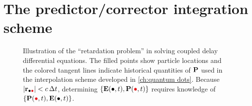 \chapter{The predictor/corrector integration scheme}

\begin{figure}[]
  \centering
  \caption{\label{fig:retardation problem} Illustration of the ``retardation problem'' in solving coupled delay differential equations.
    The filled points show particle locations and the colored tangent lines indicate historical quantities of $\vb{P}$  used in the interpolation scheme developed in \cref{ch:quantum dots}. 
    Because $\abs{\vb{r}_{\bullet \textcolor[RGB]{228,26,28}{\bullet}}} < c \, \Delta t$, determining $\qty{\vb{E}(\bullet, t),\vb{P}(\textcolor[RGB]{228,26,28}{\bullet}, t)}$ requires knowledge of $\qty{\vb{P}(\textcolor[RGB]{228,26,28}{\bullet}, t), \vb{E}(\bullet, t)}$.
  }
\end{figure}

